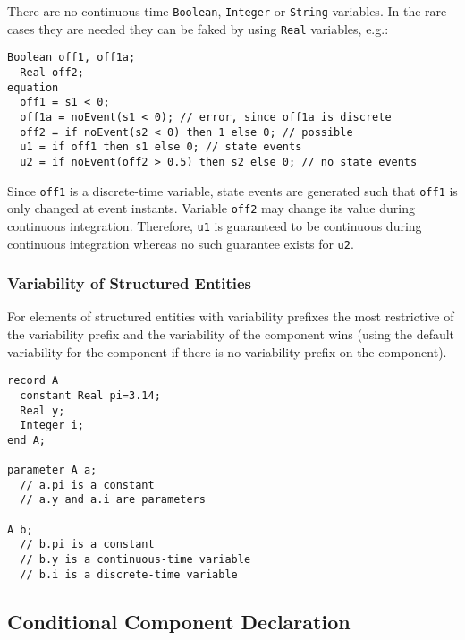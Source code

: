 \begin{nonnormative}
There are no continuous-time \lstinline!Boolean!, \lstinline!Integer! or \lstinline!String!
variables. In the rare cases they are needed they can be
faked by using \lstinline!Real! variables, e.g.:
\begin{lstlisting}[language=modelica]
  Boolean off1, off1a;
  Real off2;
equation
  off1 = s1 < 0;
  off1a = noEvent(s1 < 0); // error, since off1a is discrete
  off2 = if noEvent(s2 < 0) then 1 else 0; // possible
  u1 = if off1 then s1 else 0; // state events
  u2 = if noEvent(off2 > 0.5) then s2 else 0; // no state events
\end{lstlisting}

Since \lstinline!off1! is a discrete-time variable, state events are
generated such that \lstinline!off1! is only changed at event instants.
Variable \lstinline!off2! may change its value during continuous integration.
Therefore, \lstinline!u1! is guaranteed to be continuous during continuous
integration whereas no such guarantee exists for \lstinline!u2!.
\end{nonnormative}

\subsubsection{Variability of Structured Entities}

For elements of structured entities with variability prefixes the most
restrictive of the variability prefix and the variability of the
component wins (using the default variability for the component if there
is no variability prefix on the component).

\begin{example}
\begin{lstlisting}[language=modelica]
record A
  constant Real pi=3.14;
  Real y;
  Integer i;
end A;

parameter A a;
  // a.pi is a constant
  // a.y and a.i are parameters

A b;
  // b.pi is a constant
  // b.y is a continuous-time variable
  // b.i is a discrete-time variable
\end{lstlisting}
\end{example}

\subsection{Conditional Component Declaration}

